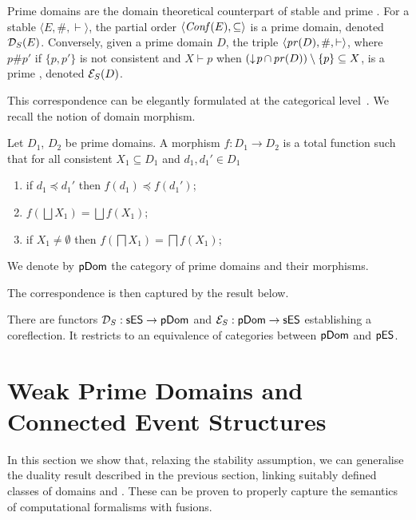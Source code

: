 Prime domains are the domain
theoretical counterpart of stable and prime {\esabbr}.
%
For a stable {\esabbr} $\langle E, \#, \vdash \rangle$, the
partial order $\langle \mathit{Conf}({{E}}), \subseteq \rangle$ is
a prime  domain, denoted $\mathcal{D}_S({{E}})$. Conversely,
given a prime  domain $D$, the triple
$\langle \mathop{\mathit{pr}({D})}, \#, \vdash \rangle$, where $p \# p'$ if $\{ p, p' \}$
is not consistent and $X \vdash p$ when
$(\mathop{\downarrow\!{p}} \cap \mathop{\mathit{pr}({D})}) \setminus \{ p \} \subseteq X$,
is a prime {\esabbr}, denoted $\mathcal{E}_S({D})$.


This correspondence can be elegantly formulated at the categorical
level~\cite{Win:ES}.
%
We recall the notion of domain morphism.

\begin{definition}
  \label{de:pdomain-category}
  Let $D_1$, $D_2$ be prime domains. A morphism
  $f : D_1 \to D_2$ is a total function such that
  for all consistent $X_1 \subseteq D_1$ and
  $d_1, d_1' \in D_1$
  \begin{enumerate}
  \item if $d_1 \preceq d_1'$ then $f(d_1) \preceq f(d_1')$;
  \item $f(\bigsqcup X_1) = \bigsqcup f(X_1)$;
  \item if $X_1 \neq \emptyset$ then
    $f(\bigsqcap X_1) = \bigsqcap f(X_1)$;
  \end{enumerate}
  We denote by $\mathsf{pDom}$ the category of prime domains and
  their morphisms.
\end{definition}

The correspondence is then captured by the result below.

\begin{theorem}[duality]
  \label{th:duality}
  There are functors $\mathcal{D}_S : \mathsf{sES} \to \mathsf{pDom}$ and
  $\mathcal{E}_S : \mathsf{pDom} \to \mathsf{sES}$ establishing a coreflection. It restricts
  to an equivalence of categories between $\mathsf{pDom}$ and $\mathsf{pES}$.
\end{theorem}


\section{Weak Prime Domains and Connected Event Structures}
\label{se:fes}


In this section we show that, relaxing the stability assumption, we
can generalise the duality result described in the previous
section, linking suitably defined classes of domains and 
{\esabbr}. These can be proven to properly capture the
semantics of computational formalisms with fusions.


